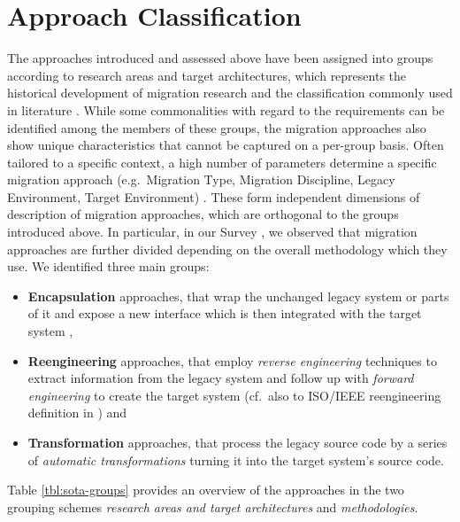 \hypertarget{approach-classification}{%
\section{Approach Classification}\label{approach-classification}}

The approaches introduced and assessed above have been assigned into groups according to research areas and target architectures, which represents the historical development of migration research and the classification commonly used in literature \autocite{Kienle2014EvolutionWeb}.
While some commonalities with regard to the requirements can be identified among the members of these groups, the migration approaches also show unique characteristics that cannot be captured on a per-group basis.
Often tailored to a specific context, a high number of parameters determine a specific migration approach (e.g.~Migration Type, Migration Discipline, Legacy Environment, Target Environment) \autocite{Heil2017Survey}.
These form independent dimensions of description of migration approaches, which are orthogonal to the groups introduced above.
In particular, in our Survey \autocite{Heil2017Survey}, we observed that migration approaches are further divided depending on the overall methodology which they use.
We identified three main groups:

\begin{itemize}
\tightlist
\item
  \textbf{Encapsulation} approaches, that wrap the unchanged legacy system or parts of it and expose a new interface which is then integrated with the target system \autocite[cf.~to \emph{external interface}, \emph{internal implementation} in \emph{encapsulation} definition][]{ISO/IEEE24765Vocabulary},
\item
  \textbf{Reengineering} approaches, that employ \emph{reverse engineering} techniques to extract information from the legacy system and follow up with \emph{forward engineering} to create the target system (cf.~also to ISO/IEEE reengineering definition in \autocite{ISO/IEEE24765Vocabulary,IEEE1219Maintenance}) and
\item
  \textbf{Transformation} approaches, that process the legacy source code by a series of \emph{automatic transformations} turning it into the target system's source code.
\end{itemize}

Table \cref{tbl:sota-groups} provides an overview of the approaches in the two grouping schemes \emph{research areas and target architectures} and \emph{methodologies}.


